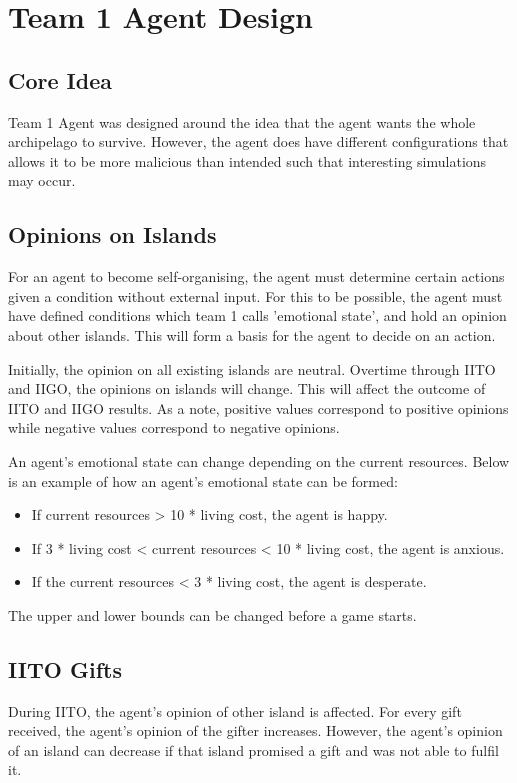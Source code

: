 \chapter{Team 1 Agent Design}

\section{Core Idea}
Team 1 Agent was designed around the idea that the agent wants the whole archipelago to survive. However, the agent does have different configurations that allows it to be more malicious than intended such that interesting simulations may occur.

\section{Opinions on Islands}
For an agent to become self-organising, the agent must determine certain actions given a condition without external input. For this to be possible, the agent must have defined conditions which team 1 calls 'emotional state', and hold an opinion about other islands. This will form a basis for the agent to decide on an action.

Initially, the opinion on all existing islands are neutral. Overtime through IITO and IIGO, the opinions on islands will change. This will affect the outcome of IITO and IIGO results. As a note, positive values correspond to positive opinions while negative values correspond to negative opinions.

An agent's emotional state can change depending on the current resources. Below is an example of how an agent's emotional state can be formed:
\begin{itemize}
    \item If current resources > 10 * living cost, the agent is happy.
    \item If 3 * living cost < current resources < 10 * living cost, the agent is anxious.
    \item If the current resources < 3 * living cost, the agent is desperate.
\end{itemize}
The upper and lower bounds can be changed before a game starts. 

\section{IITO Gifts}
During IITO, the agent's opinion of other island is affected. For every gift received, the agent's opinion of the gifter increases. However, the agent's opinion of an island can decrease if that island promised a gift and was not able to fulfil it. 

